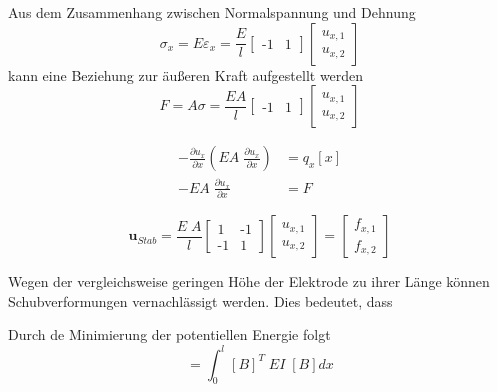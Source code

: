 Aus dem Zusammenhang zwischen Normalspannung und Dehnung
\begin{equation}
    \sigma_x = E \varepsilon_x = 
    \frac{E}{l}
    \begin{bmatrix} 
        \text{-}1 & 1 
    \end{bmatrix}
    \begin{bmatrix} 
        u_{x,1} \\
        u_{x,2} 
    \end{bmatrix}
\end{equation}
kann eine Beziehung zur äußeren Kraft aufgestellt werden
\begin{equation}
    F = A \sigma = 
    \frac{EA}{l}
    \begin{bmatrix} 
        \text{-}1 & 1 
    \end{bmatrix}
    \begin{bmatrix} 
        u_{x,1} \\
        u_{x,2} 
    \end{bmatrix}
\end{equation}

\begin{align}
   - \frac{\partial u_x}{\partial x} \left( EA\; \frac{\partial u_x}{\partial x} \right) &= q_x[x]\\
    -EA\; \frac{\partial u_x}{\partial x} &= F
\end{align}

\begin{equation}
   [K_{\text{Stab}}] \boldsymbol{u}_{Stab} = \frac{E \; A}{l} 
   \begin{bmatrix}
    1 & \text{-}1 \\
    \text{-}1 & 1
   \end{bmatrix}
   \begin{bmatrix}
    u_{x,1} \\
    u_{x,2}
   \end{bmatrix}
   = 
   \begin{bmatrix}
    f_{x,1} \\
    f_{x,2}
   \end{bmatrix}
\end{equation}

Wegen der vergleichsweise geringen Höhe der Elektrode zu ihrer Länge können Schubverformungen vernachlässigt werden. Dies bedeutet, dass 


Durch de Minimierung der potentiellen Energie folgt
\begin{equation}
    [k] = \int_0^l [B]^T \; EI \; [B] dx
\end{equation}

